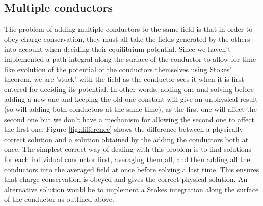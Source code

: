 \documentclass[aps,twocolumn,pre,nofootinbib,10pt]{revtex4-1}
\begin{document}
\subsection{Multiple conductors}
The problem of adding multiple conductors to the same field is that in order to obey charge conservation, they must all take the fields generated by the others into account when deciding their equilibrium potential. Since we haven't implemented a path integral along the surface of the conductor to allow for time-like evolution of the potential of the conductors themselves using Stokes' theorem, we are 'stuck' with the field as the conductor sees it when it is first entered for deciding its potential. In other words, adding one and solving before adding a new one and keeping the old one constant will give an unphysical result (so will adding both conductors at the same time), as the first one will affect the second one but we don't have a mechanism for allowing the second one to affect the first one. Figure \ref{fig:difference} shows the difference between a physically correct solution and a solution obtained by the adding the conductors both at once. The simplest correct way of dealing with this problem is 
to find solutions for each individual conductor 
first, averaging them all, and then adding all the conductors into the averaged field at once before solving a last time. This ensures that charge conservation is obeyed and gives the correct physical solution. An alternative solution would be to implement a Stokes integration along the surface of the conductor as outlined above.
\end{document}

